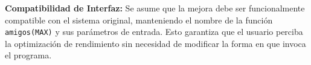 \textbf{Compatibilidad de Interfaz:} Se asume que la mejora debe ser funcionalmente compatible con el sistema original, manteniendo el nombre de la función \texttt{amigos(MAX)} y sus parámetros de entrada. Esto garantiza que el usuario perciba la optimización de rendimiento sin necesidad de modificar la forma en que invoca el programa.

